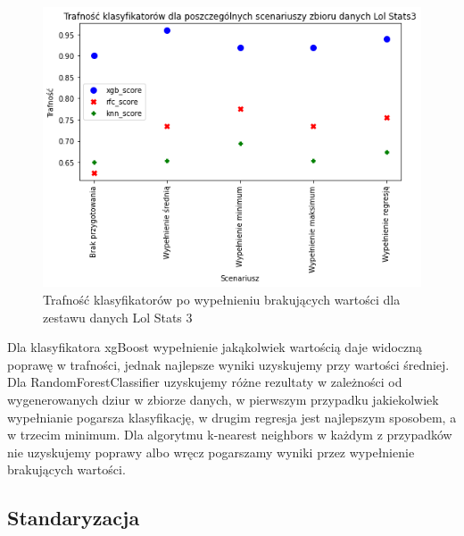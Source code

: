 \documentclass{book}
\begin{document}
\begin{figure}[H]
\centerline{\includegraphics{Lol_Stats_3_Wypełnienie_brakujących}}
\centering
\caption{Trafność klasyfikatorów po wypełnieniu brakujących wartości dla zestawu danych Lol Stats 3}
\end{figure}


Dla klasyfikatora xgBoost wypełnienie jakąkolwiek wartością daje widoczną poprawę w trafności, 
jednak najlepsze wyniki uzyskujemy przy wartości średniej. Dla RandomForestClassifier uzyskujemy 
różne rezultaty w zależności od wygenerowanych dziur w zbiorze danych, w pierwszym przypadku jakiekolwiek 
wypełnianie pogarsza klasyfikację, w drugim regresja jest najlepszym sposobem, a w trzecim minimum. 
Dla algorytmu k-nearest neighbors w każdym z przypadków nie uzyskujemy poprawy albo wręcz pogarszamy wyniki przez 
wypełnienie brakujących wartości.

\subsection{Standaryzacja}
\end{document}
